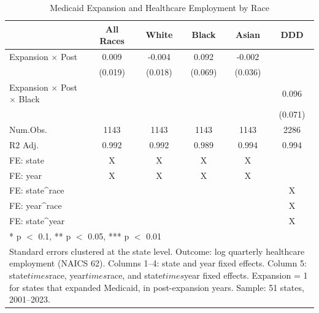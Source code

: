 \begin{table}
\centering
\caption{Medicaid Expansion and Healthcare Employment by Race}
\centering
\label{tab:main}
\begin{tabular}[t]{lccccc}
\toprule
  & All Races & White & Black & Asian & DDD\\
\midrule
Expansion $\times$ Post & 0.009 & -0.004 & 0.092 & -0.002 & \\
 & (0.019) & (0.018) & (0.069) & (0.036) & \\
Expansion $\times$ Post $\times$ Black &  &  &  &  & 0.096\\
 &  &  &  &  & (0.071)\\
\midrule
Num.Obs. & 1143 & 1143 & 1143 & 1143 & 2286\\
R2 Adj. & 0.992 & 0.992 & 0.989 & 0.994 & 0.994\\
FE: state & X & X & X & X & \\
FE: year & X & X & X & X & \\
FE: state^race &  &  &  &  & X\\
FE: year^race &  &  &  &  & X\\
FE: state^year &  &  &  &  & X\\
\bottomrule
\multicolumn{6}{l}{\rule{0pt}{1em}* p $<$ 0.1, ** p $<$ 0.05, *** p $<$ 0.01}\\
\multicolumn{6}{l}{\parbox{0.95\textwidth}{\small Standard errors clustered at the state level. Outcome: log quarterly healthcare employment (NAICS 62). Columns 1--4: state and year fixed effects. Column 5: state$times$race, year$times$race, and state$times$year fixed effects. Expansion = 1 for states that expanded Medicaid, in post-expansion years. Sample: 51 states, 2001--2023.}}\\
\end{tabular}
\end{table}
